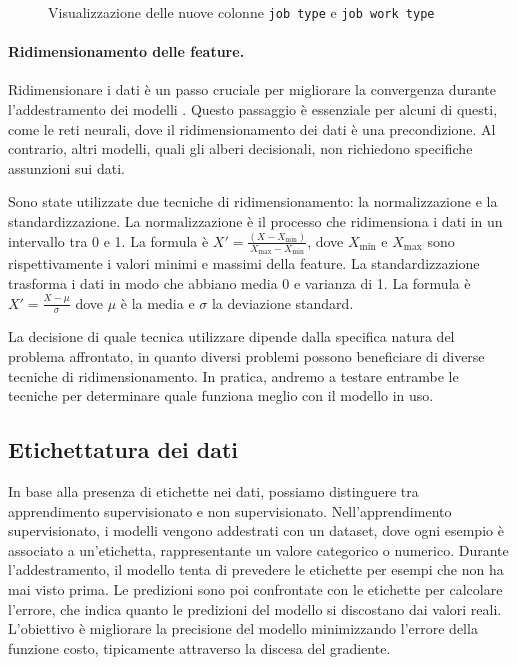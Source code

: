\begin{figure}[!ht]
    \centering
    \hspace{2cm}
    \caption{Visualizzazione delle nuove colonne \texttt{job type} e \texttt{job work type}}
    \label{fig:job_type_and_job_work_type}
\end{figure}

\paragraph{Ridimensionamento delle feature.} Ridimensionare i dati è un passo
cruciale per migliorare la convergenza durante l'addestramento dei modelli
\cite{LeCun2012}. Questo passaggio è essenziale per alcuni di questi, come le
reti neurali, dove il ridimensionamento dei dati è una precondizione. Al
contrario, altri modelli, quali gli alberi decisionali, non richiedono
specifiche assunzioni sui dati.

Sono state utilizzate due tecniche di ridimensionamento: la normalizzazione e
la standardizzazione. La normalizzazione è il processo che ridimensiona i dati
in un intervallo tra 0 e 1. La formula è
$X'=\frac{(X-X_{\min})}{X_{\max}-X_{\min}}$, dove $X_{\min}$ e $X_{\max}$ sono
rispettivamente i valori minimi e massimi della feature. La standardizzazione
trasforma i dati in modo che abbiano media 0 e varianza di 1. La formula è
$X'=\frac{X-\mu}{\sigma}$ dove $\mu$ è la media e $\sigma$ la deviazione
standard.

La decisione di quale tecnica utilizzare dipende dalla specifica natura del
problema affrontato, in quanto diversi problemi possono beneficiare di diverse
tecniche di ridimensionamento. In pratica, andremo a testare entrambe le
tecniche per determinare quale funziona meglio con il modello in uso.

\subsection{Etichettatura dei dati}

In base alla presenza di etichette nei dati, possiamo distinguere tra
apprendimento supervisionato e non supervisionato. Nell'apprendimento
supervisionato, i modelli vengono addestrati con un dataset, dove ogni esempio
è associato a un'etichetta, rappresentante un valore categorico o numerico.
Durante l'addestramento, il modello tenta di prevedere le etichette per esempi
che non ha mai visto prima. Le predizioni sono poi confrontate con le
etichette per calcolare l'errore, che indica quanto le predizioni del modello
si discostano dai valori reali. L'obiettivo è migliorare la precisione del
modello minimizzando l'errore della funzione costo, tipicamente attraverso la
discesa del gradiente.

